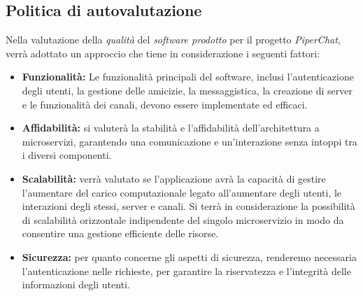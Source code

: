 

%
%
%
\subsection{Politica di autovalutazione}

%    

Nella valutazione della \emph{qualità} del \emph{software prodotto} per il progetto \textit{PiperChat}, verrà adottato un approccio che tiene in considerazione i seguenti fattori:

\begin{itemize}
    \item \textbf{Funzionalità:} Le funzionalità principali del software, inclusi l'autenticazione degli utenti, la gestione delle amicizie, la messaggistica, la creazione di server e le funzionalità dei canali, devono essere implementate ed efficaci.

    \item \textbf{Affidabilità:} si valuterà la stabilità e l'affidabilità dell'architettura a microservizi, garantendo una comunicazione e un'interazione senza intoppi tra i diversi componenti.

    \item \textbf{Scalabilità:} 
    verrà valutato se l'applicazione avrà la capacità di gestire l'aumentare del carico computazionale legato all'aumentare degli utenti, le interazioni degli stessi, server e canali. Si terrà in considerazione la possibilità di scalabilità orizzontale indipendente del singolo microservizio in modo da consentire una gestione efficiente delle risorse.

    \item \textbf{Sicurezza:} per quanto concerne gli aspetti di sicurezza, renderemo necessaria l'autenticazione nelle richieste, per garantire la riservatezza e l'integrità delle informazioni degli utenti.

\end{itemize}

